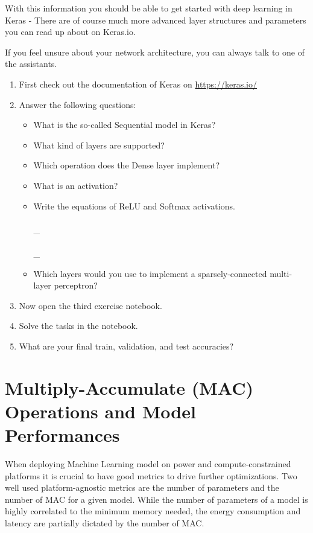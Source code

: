 \documentclass[parskip=half,notes,cadrem,toolver]{iisvlsi}
\begin{document}
With this information you should be able to get started with deep learning in Keras - There are of course much more advanced layer structures and parameters you can read up about on Keras.io. 

If you feel unsure about your network architecture, you can always talk to one of the assistants.


\begin{studtask}\label{tsk:kerastask}
    \begin{enumerate}
        \item First check out the documentation of Keras on \url{https://keras.io/}
        \item Answer the following questions:
        \begin{itemize}
            \item What is the so-called Sequential model in Keras? \answerrule
            \item What kind of layers are supported? \answerrule
            \item Which operation does the Dense layer implement? \answerrule
            \item What is an activation? \answerrule
            \item Write the equations of ReLU and Softmax activations. \answerrule\\ \\ \_\answerrule\\ \\ \_\answerrule
            \item Which layers would you use to implement a sparsely-connected multi-layer perceptron? \answerrule
        \end{itemize}
        \item Now open the third exercise notebook. 
        \item Solve the tasks in the notebook.
        \item What are your final train, validation, and test accuracies? \answerrule
    \end{enumerate}
\end{studtask}


\section{Multiply-Accumulate (MAC) Operations and Model Performances}

When deploying Machine Learning model on power and compute-constrained platforms it is crucial to have good metrics to drive further optimizations. Two well used platform-agnostic metrics are the number of parameters and the number of MAC for a given model. While the number of parameters of a model is highly correlated to the minimum memory needed, the energy consumption and latency are partially dictated by the number of MAC.
\end{document}
